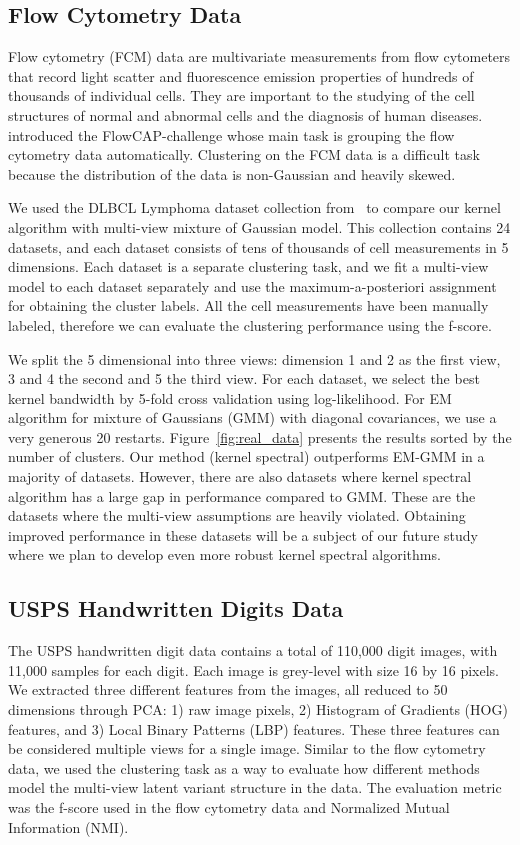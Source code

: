\documentclass{article}
\begin{document}
\subsection{Flow Cytometry Data}
% 

Flow cytometry (FCM) data are multivariate measurements from flow cytometers that record light scatter and fluorescence emission properties of hundreds of thousands of individual cells. They are important to the studying of the cell structures of normal and abnormal cells and the diagnosis of human diseases. \citet{cytometry_nature} introduced the FlowCAP-challenge whose main task is grouping the flow cytometry data automatically. Clustering on the FCM data is a difficult task because the distribution of the data is non-Gaussian and heavily skewed.

We used the DLBCL Lymphoma dataset collection from~\cite{cytometry_nature} to compare our kernel algorithm with multi-view mixture of Gaussian model.
This collection contains 24 datasets, and each dataset consists of tens of thousands of cell measurements in 5 dimensions. Each dataset is a separate clustering task, and we fit a multi-view model to each dataset separately and use the maximum-a-posteriori assignment for obtaining the cluster labels.  All the cell measurements have been manually labeled, therefore we can evaluate the clustering performance using the f-score.

We split the 5 dimensional into three views: dimension 1 and 2 as the first view, 3 and 4 the second and 5 the third view. For each dataset, we select the best kernel bandwidth by 5-fold cross validation using log-likelihood. For EM algorithm for mixture of Gaussians (GMM) with diagonal covariances, we use a very generous 20 restarts. Figure~\ref{fig:real_data} presents the results sorted by the number of clusters. Our method (kernel spectral) outperforms EM-GMM in a majority of datasets. However, there are also datasets where kernel spectral algorithm has a large gap in performance compared to GMM. These are the datasets where the multi-view assumptions are heavily violated. Obtaining improved performance in these datasets will be a subject of our future study where we plan to develop even more robust kernel spectral algorithms.


\subsection{USPS Handwritten Digits Data}
The USPS handwritten digit data contains a total of 110,000 digit images, with 11,000 samples for each digit. Each image is grey-level with size 16 by 16 pixels. We extracted three different features from the images, all reduced to 50 dimensions through PCA: 1) raw image pixels, 2) Histogram of Gradients (HOG) features, and 3) Local Binary Patterns (LBP) features. These three features can be considered multiple views for a single image. Similar to the flow cytometry data, we used the clustering task as a way to evaluate how different methods model the multi-view latent variant structure in the data. The evaluation metric was the f-score used in the flow cytometry data and Normalized Mutual Information (NMI).
\end{document}
